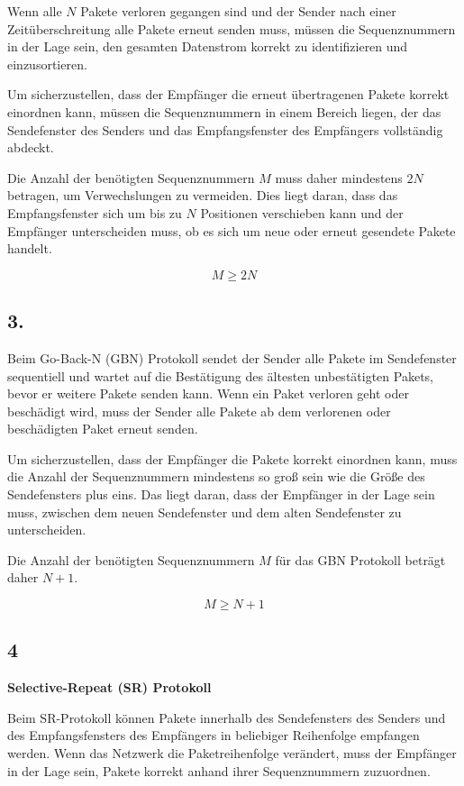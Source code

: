 \documentclass[a4paper]{scrartcl}
\begin{document}
Wenn alle $N$ Pakete verloren gegangen sind und der Sender nach einer Zeitüberschreitung alle Pakete erneut senden muss, müssen die Sequenznummern in der Lage sein, den gesamten Datenstrom korrekt zu identifizieren und einzusortieren.

Um sicherzustellen, dass der Empfänger die erneut übertragenen Pakete korrekt einordnen kann, müssen die Sequenznummern in einem Bereich liegen, der das Sendefenster des Senders und das Empfangsfenster des Empfängers vollständig abdeckt.

Die Anzahl der benötigten Sequenznummern $M$ muss daher mindestens $2N$ betragen, um Verwechslungen zu vermeiden. Dies liegt daran, dass das Empfangsfenster sich um bis zu $N$ Positionen verschieben kann und der Empfänger unterscheiden muss, ob es sich um neue oder erneut gesendete Pakete handelt.

\[
M \geq 2N
\]

\subsection*{3.}

Beim Go-Back-N (GBN) Protokoll sendet der Sender alle Pakete im Sendefenster sequentiell und wartet auf die Bestätigung des ältesten unbestätigten Pakets, bevor er weitere Pakete senden kann. Wenn ein Paket verloren geht oder beschädigt wird, muss der Sender alle Pakete ab dem verlorenen oder beschädigten Paket erneut senden.

Um sicherzustellen, dass der Empfänger die Pakete korrekt einordnen kann, muss die Anzahl der Sequenznummern mindestens so groß sein wie die Größe des Sendefensters plus eins. Das liegt daran, dass der Empfänger in der Lage sein muss, zwischen dem neuen Sendefenster und dem alten Sendefenster zu unterscheiden.

Die Anzahl der benötigten Sequenznummern $M$ für das GBN Protokoll beträgt daher $N + 1$.

\[
M \geq N + 1
\]
\subsection*{4}
\textbf{Selective-Repeat (SR) Protokoll}

Beim SR-Protokoll können Pakete innerhalb des Sendefensters des Senders und des Empfangsfensters des Empfängers in beliebiger Reihenfolge empfangen werden. Wenn das Netzwerk die Paketreihenfolge verändert, muss der Empfänger in der Lage sein, Pakete korrekt anhand ihrer Sequenznummern zuzuordnen.
\end{document}
